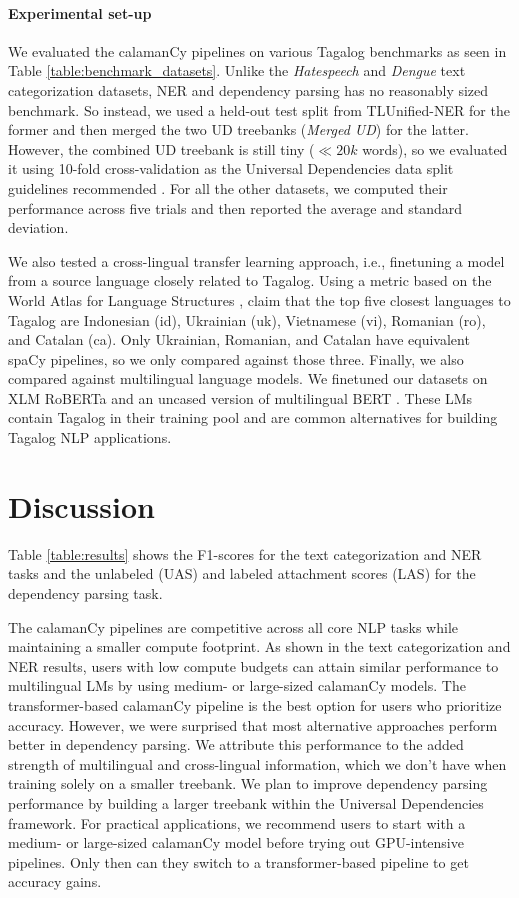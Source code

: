 \documentclass[11pt]{article}
\begin{document}
\paragraph*{Experimental set-up} 
We evaluated the calamanCy pipelines on various Tagalog benchmarks as seen in Table \ref{table:benchmark_datasets}.
Unlike the \textit{Hatespeech} and \textit{Dengue} text categorization datasets, NER and dependency parsing has no reasonably sized benchmark.
So instead, we used a held-out test split from TLUnified-NER for the former and then merged the two UD treebanks (\textit{Merged UD}) for the latter. 
However, the combined UD treebank is still tiny ($\ll 20k$ words), so we evaluated it using 10-fold cross-validation as the Universal Dependencies data split guidelines recommended \citep{Nivre2020UniversalDV}.
For all the other datasets, we computed their performance across five trials and then reported the average and standard deviation.

We also tested a cross-lingual transfer learning approach, i.e., finetuning a model from a source language closely related to Tagalog.
Using a metric based on the World Atlas for Language Structures \citep{Haspelmath2005WALS,Agic2017CrossLingualPS}, \citet{Aquino2020ParsingIT} claim that the top five closest languages to Tagalog are Indonesian (id), Ukrainian (uk), Vietnamese (vi), Romanian (ro), and Catalan (ca).
Only Ukrainian, Romanian, and Catalan have equivalent spaCy pipelines, so we only compared against those three.
Finally, we also compared against multilingual language models. 
We finetuned our datasets on XLM RoBERTa \citep{Conneau2019UnsupervisedCR} and an uncased version of multilingual BERT \citep{Devlin2019BERTPO}.
These LMs contain Tagalog in their training pool and are common alternatives for building Tagalog NLP applications.

\section{Discussion}

Table \ref{table:results} shows the F1-scores for the text categorization and NER tasks and the unlabeled (UAS) and labeled attachment scores (LAS) for the dependency parsing task.

The calamanCy pipelines are competitive across all core NLP tasks while maintaining a smaller compute footprint.
As shown in the text categorization and NER results, users with low compute budgets can attain similar performance to multilingual LMs by using medium- or large-sized calamanCy models.
The transformer-based calamanCy pipeline is the best option for users who prioritize accuracy.
However, we were surprised that most alternative approaches perform better in dependency parsing.
We attribute this performance to the added strength of multilingual and cross-lingual information, which we don't have when training solely on a smaller treebank.
We plan to improve dependency parsing performance by building a larger treebank within the Universal Dependencies framework.
For practical applications, we recommend users to start with a medium- or large-sized calamanCy model before trying out GPU-intensive pipelines. 
Only then can they switch to a transformer-based pipeline to get accuracy gains.
\end{document}

